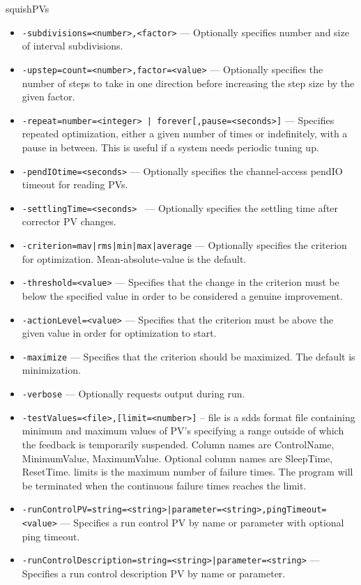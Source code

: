 \begin{sddsprog}{squishPVs}
\begin{itemize}
        \item {\tt -subdivisions=<number>,<factor>} --- Optionally specifies number and size of interval
                     subdivisions.
        \item {\tt -upstep=count=<number>,factor=<value>} --- Optionally specifies the number of steps
                to take in one direction before increasing the step size by the given factor.
        \item {\tt -repeat={number=<integer> | forever}[,pause=<seconds>]} --- Specifies repeated
                optimization, either a given number of times or indefinitely, with a pause in between.
                This is useful if a system needs periodic tuning up.
        \item {\tt -pendIOtime=<seconds>} --- Optionally specifies the channel-access pendIO timeout for reading PVs.
        \item {\tt -settlingTime=<seconds> } --- Optionally specifies the settling time after corrector PV changes.
        \item {\tt -criterion={mav|rms|min|max|average}} --- Optionally specifies the criterion for optimization.
                Mean-absolute-value is the default.
        \item {\tt -threshold=<value>} --- Specifies that the change in the criterion must be below the specified
        value in order to be considered a genuine improvement.
        \item {\tt -actionLevel=<value>} --- Specifies that the criterion must be above the given value
        in order for optimization to start.
        \item {\tt -maximize} --- Specifies that the criterion should be maximized.  The default is
                minimization.
        \item {\tt -verbose} --- Optionally requests output during run.
        \item {\tt -testValues=<file>,[limit=<number>]} --
                     file is a sdds format file containing minimum and maximum values
                     of PV's specifying a range outside of which the feedback
                     is temporarily suspended. Column names are ControlName,
                     MinimumValue, MaximumValue. Optional column names are
                     SleepTime, ResetTime.
                     limits is the maximum number of failure times. The program will be
                     terminated when the continuous failure times reaches the limit.
        \item {\tt -runControlPV={string=<string>|parameter=<string>},pingTimeout=<value>} ---
                    Specifies a run control PV by name or parameter with optional ping timeout.
        \item {\tt -runControlDescription={string=<string>|parameter=<string>}} ---
                    Specifies a run control description PV by name or parameter.
    \end{itemize}


\end{sddsprog}
